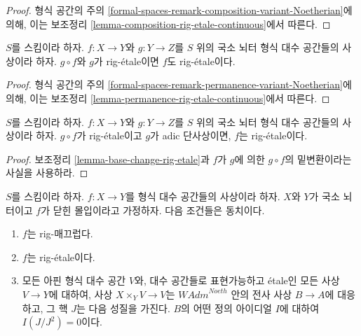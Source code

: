 \begin{proof}
형식 공간의 주의
\ref{formal-spaces-remark-composition-variant-Noetherian}에 의해,
이는 보조정리 \ref{lemma-composition-rig-etale-continuous}에서 따른다.
\end{proof}

\begin{lemma}
\label{lemma-rig-etale-permanence}
$S$를 스킴이라 하자. $f : X \to Y$와 $g : Y \to Z$를
$S$ 위의 국소 뇌터 형식 대수 공간들의 사상이라 하자.
$g \circ f$와 $g$가 rig-\'etale이면 $f$도 rig-\'etale이다.
\end{lemma}

\begin{proof}
형식 공간의 주의
\ref{formal-spaces-remark-permanence-variant-Noetherian}에 의해,
이는 보조정리 \ref{lemma-permanence-rig-etale-continuous}에서 따른다.
\end{proof}

\begin{lemma}
\label{lemma-rig-etale-alternative-permanence}
$S$를 스킴이라 하자. $f : X \to Y$와 $g : Y \to Z$를
$S$ 위의 국소 뇌터 형식 대수 공간들의 사상이라 하자.
$g \circ f$가 rig-\'etale이고 $g$가 adic 단사상이면,
$f$는 rig-\'etale이다.
\end{lemma}

\begin{proof}
보조정리 \ref{lemma-base-change-rig-etale}과 $f$가 $g$에 의한
$g \circ f$의 밑변환이라는 사실을 사용하라.
\end{proof}

\begin{lemma}
\label{lemma-closed-immersion-rig-smooth}
$S$를 스킴이라 하자. $f : X \to Y$를 형식 대수 공간들의 사상이라 하자.
$X$와 $Y$가 국소 뇌터이고 $f$가 닫힌 몰입이라고 가정하자.
다음 조건들은 동치이다.
\begin{enumerate}
\item $f$는 rig-매끄럽다.
\item $f$는 rig-\'etale이다.
\item 모든 아핀 형식 대수 공간 $V$와, 대수 공간들로 표현가능하고
\'etale인 모든 사상 $V \to Y$에 대하여, 사상
$X \times_Y V \to V$는 $\textit{WAdm}^{Noeth}$ 안의 전사 사상
$B \to A$에 대응하고, 그 핵 $J$는 다음 성질을 가진다.
$B$의 어떤 정의 아이디얼 $I$에 대하여 $I(J/J^2) = 0$이다.
\end{enumerate}
\end{lemma}

